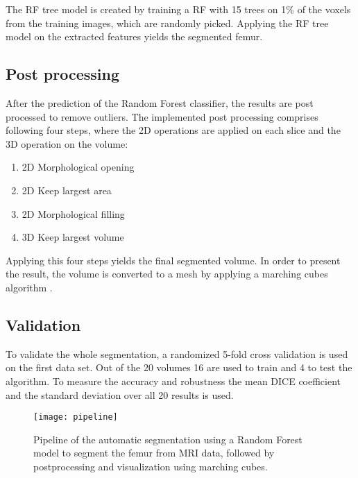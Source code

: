 The RF tree model is created by training a RF with 15 trees on 1\% of the voxels from the training images, which are randomly picked. Applying the RF tree model on the extracted features yields the segmented femur.
\subsection{Post processing}
After the prediction of the Random Forest classifier, the results are post processed to remove outliers. The implemented post processing comprises following four steps, where the 2D operations are applied on each slice and the 3D operation on the volume:
\begin{enumerate}
\item 2D Morphological opening
\item 2D Keep largest area
\item 2D Morphological filling
\item 3D Keep largest volume
\end{enumerate}
Applying this four steps yields the final segmented volume. In order to present the result, the volume is converted to a mesh by applying a marching cubes algorithm \cite{lorensen}. 
\subsection{Validation}
To validate the whole segmentation, a randomized 5-fold cross validation \cite{cross} is used on the first data set. Out of the 20 volumes 16 are used to train and 4 to test the algorithm. To measure the accuracy and robustness the mean DICE coefficient\cite{powers2011evaluation} and the standard deviation over all 20 results is used.
\begin{figure*}[!t]
\centering
\texttt{[image: pipeline]}
\caption{Pipeline of the automatic segmentation using a Random Forest model to segment the femur from MRI data, followed by postprocessing and visualization using marching cubes.}
\label{fig:pipeline}
\end{figure*}

